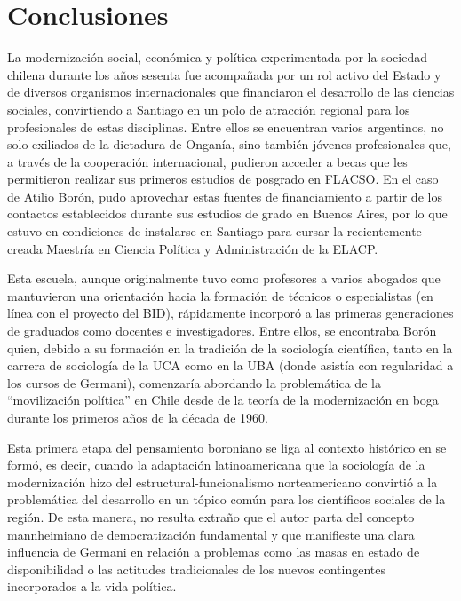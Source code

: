 {\section{Conclusiones}

La modernización social, económica y política experimentada por la sociedad chilena durante los años sesenta fue acompañada por un rol activo del Estado y de diversos organismos internacionales que financiaron el desarrollo de las ciencias sociales, convirtiendo a Santiago en un polo de atracción regional para los profesionales de estas disciplinas. Entre ellos se encuentran varios argentinos, no solo exiliados de la dictadura de Onganía, sino también jóvenes profesionales que, a través de la cooperación internacional, pudieron acceder a becas que les permitieron realizar sus primeros estudios de posgrado en FLACSO. En el caso de Atilio Borón, pudo aprovechar estas fuentes de financiamiento a partir de los contactos establecidos durante sus estudios de grado en Buenos Aires, por lo que estuvo en condiciones de instalarse en Santiago para cursar la recientemente creada Maestría en Ciencia Política y Administración de la ELACP.

Esta escuela, aunque originalmente tuvo como profesores a varios abogados que mantuvieron una orientación hacia la formación de técnicos o especialistas (en línea con el proyecto del BID), rápidamente incorporó a las primeras generaciones de graduados como docentes e investigadores. Entre ellos, se encontraba Borón quien, debido a su formación en la tradición de la sociología científica, tanto en la carrera de sociología de la UCA como en la UBA (donde asistía con regularidad a los cursos de Germani), comenzaría abordando la problemática de la \enquote{movilización política} en Chile desde de la teoría de la modernización en boga durante los primeros años de la década de 1960.

Esta primera etapa del pensamiento boroniano se liga al contexto histórico en se formó, es decir, cuando la adaptación latinoamericana que la sociología de la modernización hizo del estructural-funcionalismo norteamericano convirtió a la problemática del desarrollo en un tópico común para los científicos sociales de la región. De esta manera, no resulta extraño que el autor parta del concepto mannheimiano de democratización fundamental y que manifieste una clara influencia de Germani en relación a problemas como las masas en estado de disponibilidad o las actitudes tradicionales de los nuevos contingentes incorporados a la vida política.

}
